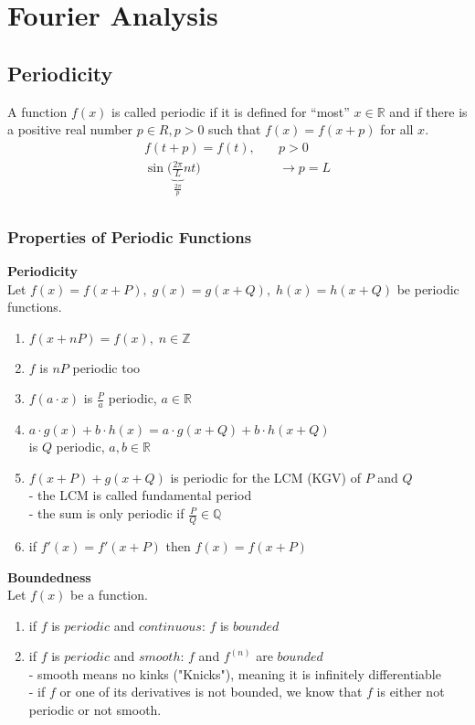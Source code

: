 \section{Fourier Analysis}

\subsection{Periodicity}
A function $f(x)$ is called periodic if it is defined for “most” $x \in \mathbb{R} $ and if there is a positive real number $p \in R, p > 0$ such that $f(x) = f(x+p)$ for all $x$.
\begin{align*}
    f(t+p)=f(t),\quad                                                  & p>0             \\
    \sin\biggl( \underbrace{\frac{2\pi}{L}}_{\frac{2\pi}{p}}nt \biggr) & \rightarrow p=L \\
\end{align*}
\subsubsection{Properties of Periodic Functions}
\textbf{Periodicity}\\
Let $f(x)=f(x+P),\; g(x)=g(x+Q),\; h(x)=h(x+Q)$ be periodic functions.
\begin{enumerate}
    \item $f(x+nP)=f(x),\; n\in\mathbb{Z}$
    \item $f$ is $nP$ periodic too
    \item $f(a\cdot x)$ is $\frac{P}{a}$ periodic, $a \in \mathbb{R}$
    \item $a\cdot g(x)+b\cdot h(x)=a\cdot g(x+Q)+b\cdot h(x+Q)$ \\is $Q$ periodic, $a, b \in \mathbb{R}$
    \item $f(x+P)+g(x+Q)$ is periodic for the LCM (KGV) of $P$ and $Q$\\
          - the LCM is called fundamental period \\
          - the sum is only periodic if $\frac{P}{Q}\in \mathbb{Q}$
    \item if $f'(x)=f'(x+P)$ then $f(x)=f(x+P)$
\end{enumerate}
\textbf{Boundedness}\\
Let $f(x)$ be a function.
\begin{enumerate}
    \item if $f$ is $periodic$ and $continuous$: $f$ is $bounded$
    \item if $f$ is $periodic$ and $smooth$: $f$ and $f^{(n)}$ are $bounded$\\
          - smooth means no kinks ("Knicks"), meaning it is infinitely differentiable\\
          - if $f$ or one of its derivatives is not bounded, we know that $f$ is either not periodic or not smooth.
\end{enumerate}

